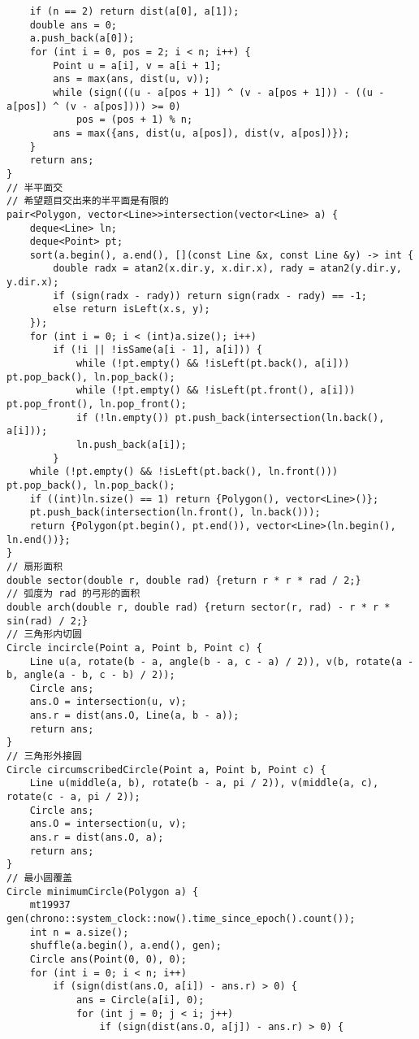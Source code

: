 \begin{verbatim}
    if (n == 2) return dist(a[0], a[1]);
    double ans = 0;
    a.push_back(a[0]);
    for (int i = 0, pos = 2; i < n; i++) {
        Point u = a[i], v = a[i + 1];
        ans = max(ans, dist(u, v));
        while (sign(((u - a[pos + 1]) ^ (v - a[pos + 1])) - ((u - a[pos]) ^ (v - a[pos]))) >= 0)
            pos = (pos + 1) % n;
        ans = max({ans, dist(u, a[pos]), dist(v, a[pos])});
    }
    return ans;
}
// 半平面交
// 希望题目交出来的半平面是有限的
pair<Polygon, vector<Line>>intersection(vector<Line> a) {
    deque<Line> ln;
    deque<Point> pt;
    sort(a.begin(), a.end(), [](const Line &x, const Line &y) -> int {
        double radx = atan2(x.dir.y, x.dir.x), rady = atan2(y.dir.y, y.dir.x);
        if (sign(radx - rady)) return sign(radx - rady) == -1;
        else return isLeft(x.s, y);
    });
    for (int i = 0; i < (int)a.size(); i++)
        if (!i || !isSame(a[i - 1], a[i])) {
            while (!pt.empty() && !isLeft(pt.back(), a[i])) pt.pop_back(), ln.pop_back();
            while (!pt.empty() && !isLeft(pt.front(), a[i])) pt.pop_front(), ln.pop_front();
            if (!ln.empty()) pt.push_back(intersection(ln.back(), a[i]));
            ln.push_back(a[i]);
        }
    while (!pt.empty() && !isLeft(pt.back(), ln.front())) pt.pop_back(), ln.pop_back();
    if ((int)ln.size() == 1) return {Polygon(), vector<Line>()};
    pt.push_back(intersection(ln.front(), ln.back()));
    return {Polygon(pt.begin(), pt.end()), vector<Line>(ln.begin(), ln.end())};
}
// 扇形面积
double sector(double r, double rad) {return r * r * rad / 2;}
// 弧度为 rad 的弓形的面积
double arch(double r, double rad) {return sector(r, rad) - r * r * sin(rad) / 2;}
// 三角形内切圆
Circle incircle(Point a, Point b, Point c) {
    Line u(a, rotate(b - a, angle(b - a, c - a) / 2)), v(b, rotate(a - b, angle(a - b, c - b) / 2));
    Circle ans;
    ans.O = intersection(u, v);
    ans.r = dist(ans.O, Line(a, b - a));
    return ans;
}
// 三角形外接圆
Circle circumscribedCircle(Point a, Point b, Point c) {
    Line u(middle(a, b), rotate(b - a, pi / 2)), v(middle(a, c), rotate(c - a, pi / 2));
    Circle ans;
    ans.O = intersection(u, v);
    ans.r = dist(ans.O, a);
    return ans;
}
// 最小圆覆盖
Circle minimumCircle(Polygon a) {
    mt19937 gen(chrono::system_clock::now().time_since_epoch().count());
    int n = a.size();
    shuffle(a.begin(), a.end(), gen);
    Circle ans(Point(0, 0), 0);
    for (int i = 0; i < n; i++)
        if (sign(dist(ans.O, a[i]) - ans.r) > 0) {
            ans = Circle(a[i], 0);
            for (int j = 0; j < i; j++)
                if (sign(dist(ans.O, a[j]) - ans.r) > 0) {

\end{verbatim}
